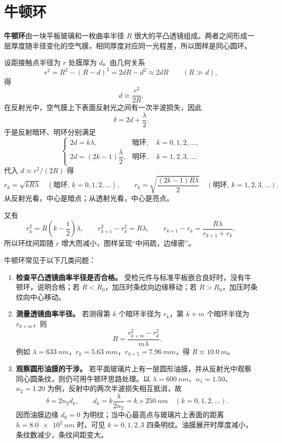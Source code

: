 
\section{牛顿环}

\begin{conclusion}[牛顿环]
\textbf{牛顿环}由一块平板玻璃和一枚曲率半径 \(R\) 很大的平凸透镜组成。两者之间形成一层厚度随半径变化的空气膜，相同厚度对应同一光程差，所以图样是同心圆环。

设距接触点半径为 \(r\) 处膜厚为 \(d\)。由几何关系
\[
r^2=R^2-(R-d)^2=2dR-d^2\approx 2dR\qquad(R\gg d),
\]
得
\[
d\approx \frac{r^2}{2R}.
\]
在反射光中，空气膜上下表面反射光之间有一次半波损失，因此
\[
\delta=2d+\frac{\lambda}{2}.
\]
于是反射暗环、明环分别满足
\[
\begin{cases}
2d=k\lambda, & \text{暗环},\quad k=0,1,2,\dots,\\[4pt]
2d=(2k-1)\dfrac{\lambda}{2}, & \text{明环},\quad k=1,2,3,\dots.
\end{cases}
\]
代入 \(d\approx r^2/(2R)\) 得
\[
r_k=\sqrt{kR\lambda}\quad(\text{暗环},\,k=0,1,2,\dots),\qquad
r_k=\sqrt{\frac{(2k-1)R\lambda}{2}}\quad(\text{明环},\,k=1,2,3,\dots).
\]
从反射光看，中心是暗点；从透射光看，中心是亮点。

又有
\[
r_k^2=R\left(k-\frac12\right)\lambda,\qquad
r_{k+1}^2-r_k^2=R\lambda,\qquad
r_{k+1}-r_k=\frac{R\lambda}{r_{k+1}+r_k},
\]
所以环纹间距随 \(r\) 增大而减小，图样呈现“中间疏，边缘密”。

牛顿环常见于以下几类问题：
\begin{enumerate}
  \item \textbf{检查平凸透镜曲率半径是否合格。} 受检元件与标准平板嵌合良好时，没有牛顿环，说明合格；若 \(R<R_0\)，加压时条纹向边缘移动；若 \(R>R_0\)，加压时条纹向中心移动。
  \item \textbf{测量透镜曲率半径。} 若测得第 \(k\) 个暗环半径为 \(r_k\)，第 \(k+m\) 个暗环半径为 \(r_{k+m}\)，则
  \[
  R=\frac{r_{k+m}^2-r_k^2}{m\lambda}.
  \]
  例如 \(\lambda=\SI{633}{nm}\)，\(r_k=\SI{5.63}{mm}\)，\(r_{k+5}=\SI{7.96}{mm}\)，得 \(R\approx\SI{10.0}{m}\)。
  \item \textbf{观察圆形油膜的干涉。} 若平面玻璃片上有一层圆形油膜，并从反射光中观察同心圆条纹，则仍可用牛顿环思路处理。以 \(\lambda=\SI{600}{nm}\)、\(n_1=1.50\)、\(n_2=1.20\) 为例，反射中的两次半波损失相互抵消，故
  \[
  \delta=2n_2d_k,\qquad d_k=k\frac{\lambda}{2n_2}=k\times\SI{250}{nm}\quad(k=0,1,2,\dots).
  \]
  因而油膜边缘 \(d_0=0\) 为明纹；当中心最高点与玻璃片上表面的距离 \(h=\SI{8.0e2}{nm}\) 时，可见 \(k=0,1,2,3\) 四条明纹。油膜展开时厚度减小，条纹数减少，条纹间距变大。
\end{enumerate}
\end{conclusion}




